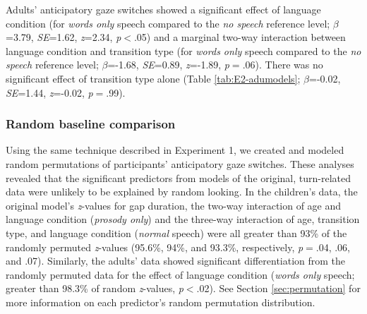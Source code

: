 \documentclass[authoryear, 12pt]{elsarticle}
\begin{document}
Adults' anticipatory gaze switches showed a significant effect of language condition (for \textit{words only} speech compared to the \textit{no speech} reference level; \textit{$\beta$}=3.79, \textit{SE}=1.62, \textit{z}=2.34, \textit{p}$<$.05) and a marginal two-way interaction between language condition and transition type (for \textit{words only} speech compared to the \textit{no speech} reference level; \textit{$\beta$}=-1.68, \textit{SE}=0.89, \textit{z}=-1.89, \textit{p}$=$.06). There was no significant effect of transition type alone (Table \ref{tab:E2-adumodels}; \textit{$\beta$}=-0.02, \textit{SE}=1.44, \textit{z}=-0.02, \textit{p}$=$.99).


\subsubsection*{Random baseline comparison}
\label{sec:randbaseline2}

Using the same technique described in Experiment 1, we created and modeled random permutations of participants' anticipatory gaze switches. These analyses revealed that the significant predictors from models of the original, turn-related data were unlikely to be explained by random looking. In the children's data, the original model's \textit{z}-values for gap duration, the two-way interaction of age and language condition (\textit{prosody only}) and the three-way interaction of age, transition type, and language condition (\textit{normal} speech) were all greater than 93\% of the randomly permuted \textit{z}-values (95.6\%, 94\%, and 93.3\%, respectively, \textit{p}$=$.04, .06, and .07). Similarly, the adults' data showed significant differentiation from the randomly permuted data for the effect of language condition (\textit{words only} speech; greater than 98.3\% of random \textit{z}-values, \textit{p}$<$.02). See Section \ref{sec:permutation} for more information on each predictor's random permutation distribution.
\end{document}
